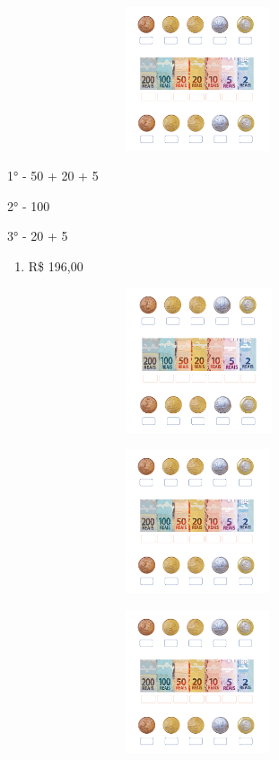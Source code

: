 \includegraphics[width=4.40625in,height=1.66152in]{media/image72.png}

1° - 50 + 20 + 5

2° - 100

3° - 20 + 5

\begin{enumerate}
\def\labelenumi{\alph{enumi})}
\item
  R\$ 196,00
\end{enumerate}

\includegraphics[width=4.45833in,height=1.68116in]{media/image72.png}

\includegraphics[width=4.40625in,height=1.66152in]{media/image72.png}

\includegraphics[width=4.40625in,height=1.66152in]{media/image72.png}

